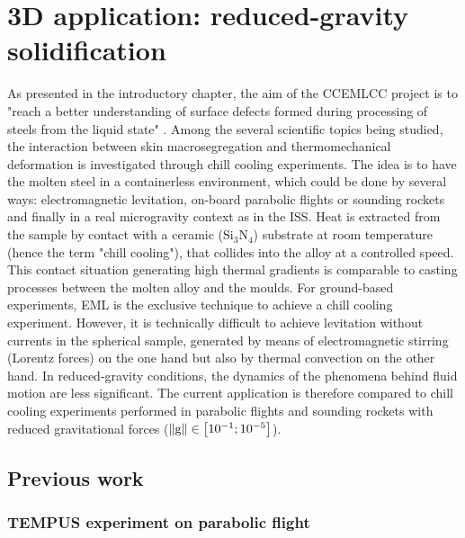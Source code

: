 \section{3D application: reduced-gravity solidification}

As presented in the introductory chapter, the aim of the CCEMLCC project is to "reach a better
understanding of surface defects formed during processing of steels from the liquid state" \citep{gandin_project_2014}.
Among the several scientific topics being studied, the interaction between skin macrosegregation 
and thermomechanical deformation is investigated through chill cooling experiments.
The idea is to have the molten steel in a containerless environment, which could be done by several ways: 
electromagnetic levitation, on-board parabolic flights or sounding rockets and finally
in a real microgravity context as in the ISS. Heat is extracted from the sample by contact with a ceramic 
(Si$_3$N$_4$) substrate at room temperature (hence the term "chill cooling"), that collides into the alloy at a controlled speed.
This contact situation generating high thermal gradients is comparable to casting processes between the molten alloy and the moulds.
For ground-based experiments, EML is the exclusive technique to achieve a chill cooling experiment. However, it is technically 
difficult to achieve levitation without currents in the spherical sample, generated by means of electromagnetic stirring (Lorentz forces) on the one hand but also
by thermal convection on the other hand. In reduced-gravity conditions, the dynamics of the phenomena behind fluid motion are less significant.
The current application is therefore compared to chill cooling experiments performed in parabolic flights and sounding rockets 
with reduced gravitational forces ($\lVert \boldsymbol{\text{g}} \rVert \in \left[ 10^{-1};10^{-5} \right]$\si{\uacceleration}).


\subsection{Previous work}

\subsubsection{TEMPUS experiment on parabolic flight}

